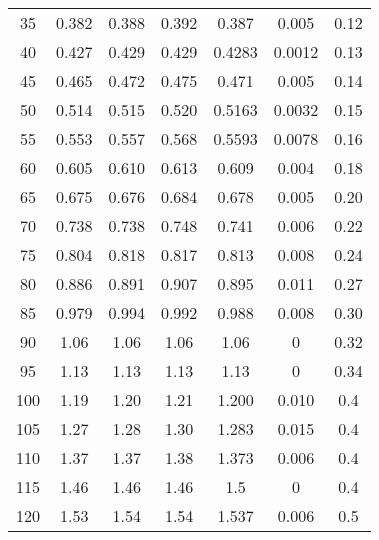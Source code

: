 \begin{table}[H]
{\begin{tabular}{
        S[table-format=3.0] 
        S[table-format=1.4] S[table-format=1.4] S[table-format=1.4]
        S[table-format=1.4] S[table-format=1.4] S[table-format=1.3]
        }
        35  &  0.382  & 0.388  &  0.392  &0.387  & 0.005  & 0.12  \\
        40  &  0.427  & 0.429  &  0.429  &0.4283 & 0.0012 & 0.13  \\
        45  &  0.465  & 0.472  &  0.475  &0.471  & 0.005  & 0.14  \\
        50  &  0.514  & 0.515  &  0.520  &0.5163 & 0.0032 & 0.15  \\
        55  &  0.553  & 0.557  &  0.568  &0.5593 & 0.0078 & 0.16  \\
        60  &  0.605  & 0.610  &  0.613  &0.609  & 0.004  & 0.18  \\
        65  &  0.675  & 0.676  &  0.684  &0.678  & 0.005  & 0.20  \\
        70  &  0.738  & 0.738  &  0.748  &0.741  & 0.006  & 0.22  \\
        75  &  0.804  & 0.818  &  0.817  &0.813  & 0.008  & 0.24  \\
        80  &  0.886  & 0.891  &  0.907  &0.895  & 0.011  & 0.27  \\
        85  &  0.979  & 0.994  &  0.992  &0.988  & 0.008  & 0.30  \\
        90  &  1.06   & 1.06   &  1.06   &1.06   & 0      & 0.32  \\
        95  &  1.13   & 1.13   &  1.13   &1.13   & 0      & 0.34  \\
        100 &  1.19   & 1.20   &  1.21   &1.200  & 0.010  & 0.4   \\
        105 &  1.27   & 1.28   &  1.30   &1.283  & 0.015  & 0.4   \\
        110 &  1.37   & 1.37   &  1.38   &1.373  & 0.006  & 0.4   \\
        115 &  1.46   & 1.46   &  1.46   &1.5    & 0      & 0.4   \\
        120 &  1.53   & 1.54   &  1.54   &1.537  & 0.006  & 0.5   \\
        \bottomrule 
      \end{tabular}
      }
\end{table}
%
